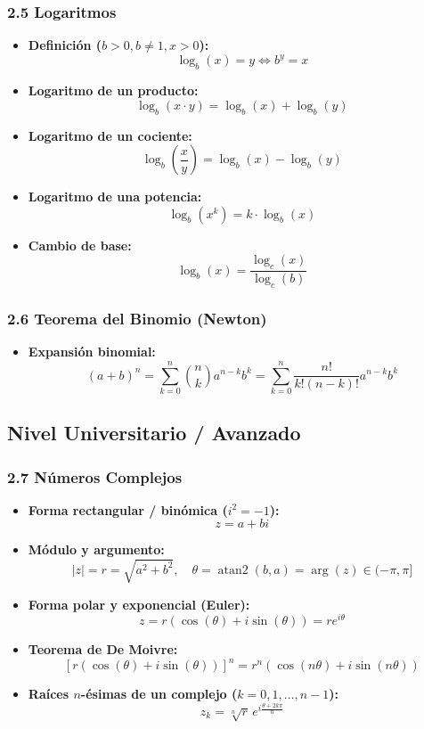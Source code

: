 \documentclass[11pt,a4paper]{article}
\begin{document}
\subsubsection*{2.5 Logaritmos}

\begin{itemize}
  \item \textbf{Definición ($b > 0, b \ne 1, x > 0$):}
  \[
    \log_b(x) = y \iff b^y = x
  \]
  \item \textbf{Logaritmo de un producto:}
  \[
    \log_b(x \cdot y) = \log_b(x) + \log_b(y)
  \]
  \item \textbf{Logaritmo de un cociente:}
  \[
    \log_b\left(\frac{x}{y}\right) = \log_b(x) - \log_b(y)
  \]
  \item \textbf{Logaritmo de una potencia:}
  \[
    \log_b(x^k) = k \cdot \log_b(x)
  \]
  \item \textbf{Cambio de base:}
  \[
    \log_b(x) = \frac{\log_c(x)}{\log_c(b)}
  \]
\end{itemize}

\subsubsection*{2.6 Teorema del Binomio (Newton)}

\begin{itemize}
  \item \textbf{Expansión binomial:}
  \[
    (a + b)^n = \sum_{k=0}^n \binom{n}{k} a^{n - k} b^k = \sum_{k=0}^n \frac{n!}{k!(n - k)!} a^{n - k} b^k
  \]
\end{itemize}

\subsection*{Nivel Universitario / Avanzado}

\subsubsection*{2.7 Números Complejos}

\begin{itemize}
  \item \textbf{Forma rectangular / binómica ($i^2 = -1$):}
  \[
    z = a + bi
  \]
  \item \textbf{Módulo y argumento:}
  \[
    |z| = r = \sqrt{a^2 + b^2}, \quad \theta = \operatorname{atan2}(b, a) = \operatorname{arg}(z) \in (-\pi, \pi]
  \]
  \item \textbf{Forma polar y exponencial (Euler):}
  \[
    z = r(\cos(\theta) + i\sin(\theta)) = r e^{i\theta}
  \]
  \item \textbf{Teorema de De Moivre:}
  \[
    [r(\cos(\theta) + i\sin(\theta))]^n = r^n (\cos(n\theta) + i\sin(n\theta))
  \]
  \item \textbf{Raíces $n$-ésimas de un complejo ($k = 0, 1, \dots, n-1$):}
  \[
    z_k = \sqrt[n]{r} \, e^{i \frac{\theta + 2k\pi}{n}}
  \]
\end{itemize}
\end{document}
